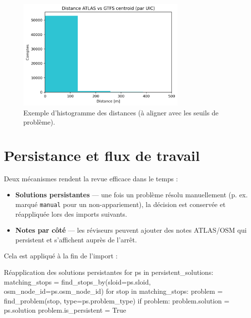 \begin{figure}[h]
  \centering
  \includegraphics[width=0.75\textwidth]{../figures/plots/atlas_vs_gtfs_distance_hist.png}
  \caption{Exemple d'histogramme des distances (à aligner avec les seuils de problème).}
\end{figure}

\section{Persistance et flux de travail}
Deux mécanismes rendent la revue efficace dans le temps :
\begin{itemize}
  \item \textbf{Solutions persistantes} — une fois un problème résolu manuellement (p. ex. marqué \texttt{manual} pour un non-appariement), la décision est conservée et réappliquée lors des imports suivants.
  \item \textbf{Notes par côté} — les réviseurs peuvent ajouter des notes ATLAS/OSM qui persistent et s'affichent auprès de l'arrêt.
\end{itemize}

\noindent Cela est appliqué à la fin de l'import :
\begin{codebox}[language=Python]{Réapplication des solutions persistantes}
for ps in persistent_solutions:
    matching_stops = find_stops_by(sloid=ps.sloid, osm_node_id=ps.osm_node_id)
    for stop in matching_stops:
        problem = find_problem(stop, type=ps.problem_type)
        if problem:
            problem.solution = ps.solution
            problem.is_persistent = True
\end{codebox}

